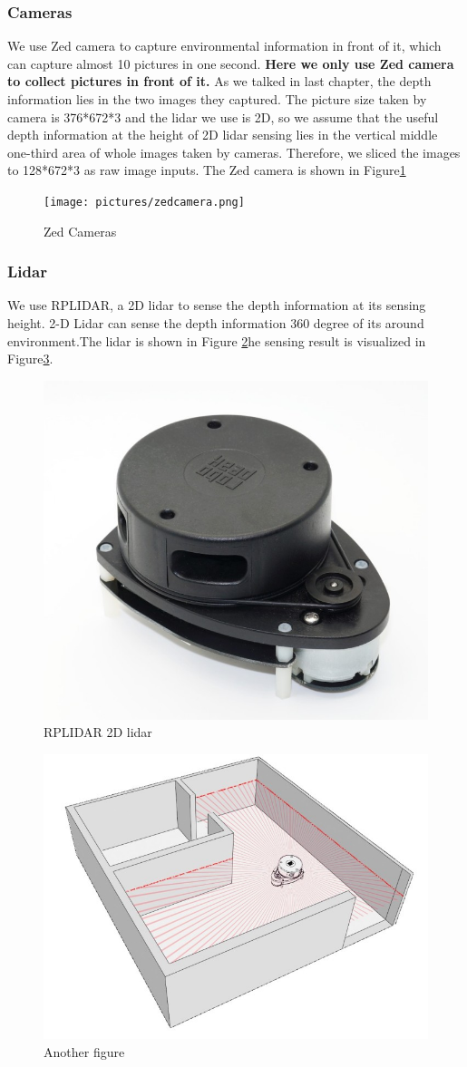 \documentclass[10pt,twocolumn,letterpaper]{article}
\begin{document}
\subsubsection{Cameras}
We use Zed camera to capture environmental information in front of it, which can capture almost 10 pictures in one second. \textbf{Here we only use Zed camera to collect pictures in front of it.} As we talked in last chapter, the depth information lies in the two images they captured. The picture size taken by camera is 376*672*3 and the lidar we use is 2D, so we assume that the useful depth information at the height of 2D lidar sensing lies in the vertical middle one-third area of whole images taken by cameras. Therefore, we sliced the images to 128*672*3 as raw image inputs. The Zed camera is shown in Figure\ref{zed_camera}
\begin{figure}[t]
	\begin{center}
		\texttt{[image: pictures/zedcamera.png]}
	\end{center}
	\caption{Zed Cameras}
	\label{zed_camera}
\end{figure}


\subsubsection{Lidar}
We use RPLIDAR, a 2D lidar to sense the depth information at its sensing height. 2-D Lidar can sense the depth information 360 degree of its around environment.The lidar is shown in Figure \ref{lidar}he sensing result is visualized in Figure\ref{lidar_sensing}.

\begin{figure}
	\centering
		\includegraphics[width=.3\linewidth]{pictures/lidar.jpg}
		\caption{RPLIDAR 2D lidar}
		\label{lidar}

\end{figure}
\begin{figure}
		\centering
		\includegraphics[width=.8\linewidth]{pictures/lidar_sensing.jpg}
		\caption{Another figure}
		\label{lidar_sensing}
\end{figure}
\end{document}
